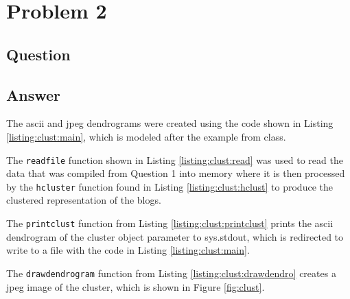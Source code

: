 \section{Problem 2}

\subsection{Question}


\subsection{Answer}
The ascii and jpeg dendrograms were created using the code shown in Listing \ref{listing:clust:main}, which is modeled after the example from class. 



The {\tt readfile} function shown in Listing \ref{listing:clust:read} was used to read the data that was compiled from Question 1 into memory where it is then processed by the {\tt hcluster} function found in Listing \ref{listing:clust:hclust} to produce the clustered representation of the blogs.





The {\tt printclust} function from Listing \ref{listing:clust:printclust} prints the ascii dendrogram of the cluster object parameter to sys.stdout, which is redirected to write to a file with the code in Listing \ref{listing:clust:main}.



The {\tt drawdendrogram} function from Listing \ref{listing:clust:drawdendro} creates a jpeg image of the cluster, which is shown in Figure \ref{fig:clust}.



